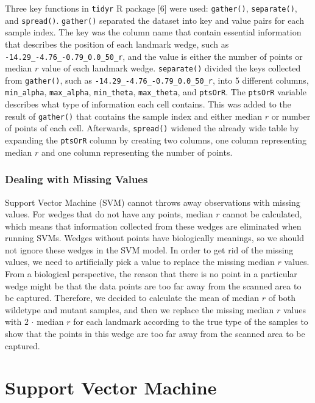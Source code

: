 \documentclass[10pt,letterpaper]{article}
\begin{document}
Three key functions in \texttt{tidyr} R package {[}6{]} were used:
\texttt{gather()}, \texttt{separate()}, and \texttt{spread()}.
\texttt{gather()} separated the dataset into key and value pairs for
each sample index. The key was the column name that contain essential
information that describes the position of each landmark wedge, such as
\texttt{-14.29\_-4.76\_-0.79\_0.0\_50\_r}, and the value is either the
number of points or median \(r\) value of each landmark wedge.
\texttt{separate()} divided the keys collected from \texttt{gather()},
such as \texttt{-14.29\_-4.76\_-0.79\_0.0\_50\_r}, into 5 different
columns, \texttt{min\_alpha}, \texttt{max\_alpha}, \texttt{min\_theta},
\texttt{max\_theta}, and \texttt{ptsOrR}. The \texttt{ptsOrR} variable
describes what type of information each cell contains. This was added to
the result of \texttt{gather()} that contains the sample index and
either median \(r\) or number of points of each cell. Afterwards,
\texttt{spread()} widened the already wide table by expanding the
\texttt{ptsOrR} column by creating two columns, one column representing
median \(r\) and one column representing the number of points.

\subsubsection{Dealing with Missing
Values}\label{dealing-with-missing-values}

Support Vector Machine (SVM) cannot throws away observations with
missing values. For wedges that do not have any points, median \(r\)
cannot be calculated, which means that information collected from these
wedges are eliminated when running SVMs. Wedges without points have
biologically meanings, so we should not ignore these wedges in the SVM
model. In order to get rid of the missing values, we need to
artificially pick a value to replace the missing median \(r\) values.
From a biological perspective, the reason that there is no point in a
particular wedge might be that the data points are too far away from the
scanned area to be captured. Therefore, we decided to calculate the mean
of median \(r\) of both wildetype and mutant samples, and then we
replace the missing median \(r\) values with \(2\) \(\cdot\) median
\(r\) for each landmark according to the true type of the samples to
show that the points in this wedge are too far away from the scanned
area to be captured.

\section{Support Vector Machine}\label{support-vector-machine-1}
\end{document}
